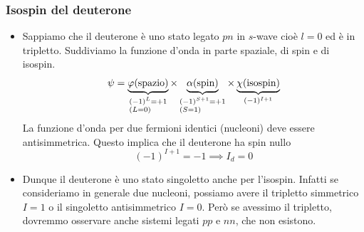 \subsubsection{Isospin del deuterone}
\begin{itemize}
\item Sappiamo che il deuterone è uno stato legato $pn$ in $s$-wave cioè $l=0$ ed è in tripletto. Suddiviamo la funzione d'onda in parte spaziale, di spin e di isospin.
\begin{equation*}
\psi=\underbrace{\varphi(\text{spazio})}_{
\begin{subarray}
    ((-1)^L=+1\\
    (L=0)
\end{subarray}    
}\times\underbrace{\alpha(\text{spin})}_{
    \begin{subarray}
        ((-1)^{S+1}=+1\\
        (S=1)
    \end{subarray}    
    }\times\underbrace{\chi(\text{isospin})}_{(-1)^{I+1}}
\end{equation*}
La funzione d'onda per due fermioni identici (nucleoni) deve essere antisimmetrica. Questo implica che il deuterone ha spin nullo
\begin{equation*}
    (-1)^{I+1}=-1\implies I_d=0
\end{equation*}
\item Dunque il deuterone è uno stato singoletto anche per l'isospin. Infatti se consideriamo in generale due nucleoni, possiamo avere il tripletto simmetrico $I=1$ o il singoletto antisimmetrico $I=0$. Però se avessimo il tripletto, dovremmo osservare anche sistemi legati $pp$ e $nn$, che non esistono.
\end{itemize}
